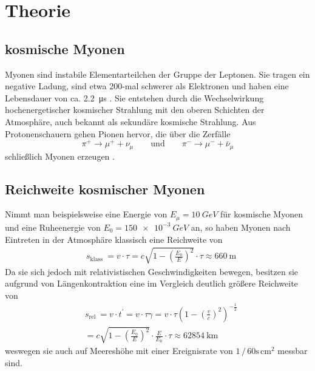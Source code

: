 \section{Theorie}
\label{sec:Theorie}

\subsection{kosmische Myonen}
\label{subsec:kosmische Myonen}

Myonen sind instabile Elementarteilchen der Gruppe der Leptonen. 
Sie tragen ein negative Ladung, sind etwa 200-mal schwerer als Elektronen 
und haben eine Lebensdauer von ca. \qty{2,2}{\micro\second} \cite[125]{grupen}.
Sie entstehen durch die Wechselwirkung hochenergetischer kosmischer Strahlung
mit den oberen Schichten der Atmosphäre,
auch bekannt als sekundäre kosmische Strahlung.
Aus Protonenschauern gehen Pionen hervor,
die über die Zerfälle
\begin{equation*}
    \pi^{+} \rightarrow \mu^{+}+\nu_\mu \qquad \text {und} \qquad \pi^{-} \rightarrow \mu^{-}+\bar{\nu}_\mu
\end{equation*}
schließlich Myonen erzeugen \cite{demtroeder4}.


\subsection{Reichweite kosmischer Myonen}
\label{subsec:Reichweite kosmischer Myonen}

Nimmt man beispielsweise eine Energie von $E_\mu = \qty{10}{GeV}$ für kosmische Myonen 
und eine Ruheenergie von $E_0 = \qty{150e-3}{GeV}$ an,
so haben Myonen nach Eintreten in der Atmosphäre klassisch eine Reichweite von
\begin{equation}
    \begin{aligned}
    & s_{\text {klass }}=v \cdot \tau=c \sqrt{1-\left(\frac{E_0}{E}\right)^2} \cdot \tau \approx 660 \mathrm{~m}
    \end{aligned}
\end{equation}
Da sie sich jedoch mit relativistischen Geschwindigkeiten bewegen,
besitzen sie aufgrund von Längenkontraktion eine im Vergleich deutlich größere Reichweite von 
\begin{equation}
    \begin{aligned}
    & s_{\text {rel }}=v \cdot t^{\prime}=v \cdot \tau \gamma=v \cdot \tau\left(1-\left(\frac{v}{c}\right)^2\right)^{-\frac{1}{2}} \\
    & =c \sqrt{1-\left(\frac{E_0}{E}\right)^2} \cdot \frac{E}{E_0} \cdot \tau \approx 62854 \mathrm{~km} 
    \end{aligned}
\end{equation}
weswegen sie auch auf Meereshöhe mit einer Ereignisrate von $1 \, / \, 60\text{s} \, \text{cm}^2$ \cite[208]{grupen} messbar sind.


